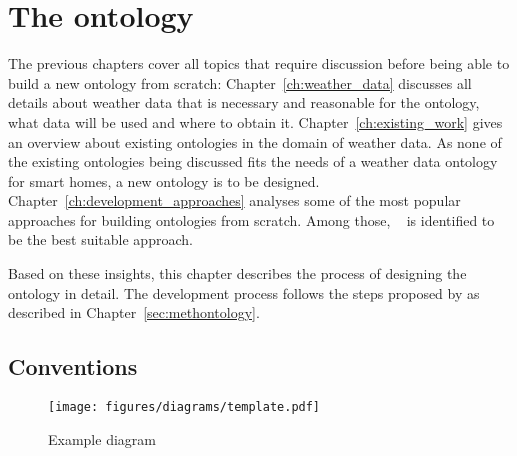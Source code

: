 \chapter{The \smarthomeweather ontology}
\label{ch:smarthomeweather_ontology}





The previous chapters cover all topics that require discussion before being able to build a new ontology from scratch: Chapter~\ref{ch:weather_data} discusses all details about weather data that is necessary and reasonable for the \smarthomeweather ontology, what data will be used and where to obtain it. Chapter~\ref{ch:existing_work} gives an overview about existing ontologies in the domain of weather data. As none of the existing ontologies being discussed fits the needs of a weather data ontology for smart homes, a new ontology is to be designed. Chapter~\ref{ch:development_approaches} analyses some of the most popular approaches for building ontologies from scratch. Among those, \methontology~\cite{Methontology} is identified to be the best suitable approach.

Based on these insights, this chapter describes the process of designing the \smarthomeweather ontology in detail. The development process follows the steps proposed by \methontology as described in Chapter~\ref{sec:methontology}.

\section{Conventions}
\label{sec:ontology_conventions}

\begin{figure}
  \texttt{[image: figures/diagrams/template.pdf]}
  \caption{Example diagram}
  \label{fig:diagram_example}
\end{figure}


